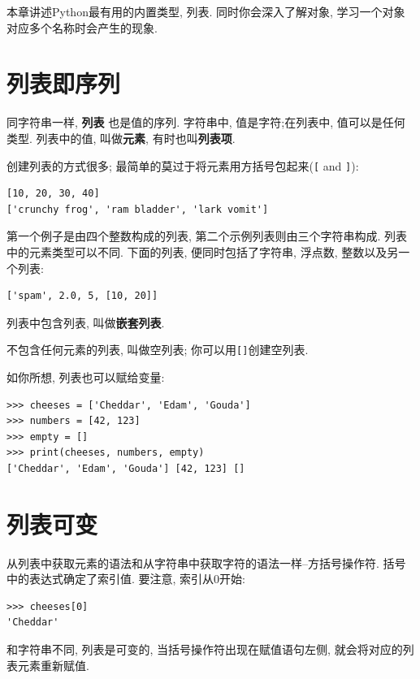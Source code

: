 \documentclass[10pt]{book}
\begin{document}
本章讲述Python最有用的内置类型, 列表. 
同时你会深入了解对象, 学习一个对象对应多个名称时会产生的现象. 


\section{列表即序列}
\label{sequence}

同字符串一样, {\bf 列表} 也是值的序列. 
字符串中, 值是字符;在列表中, 值可以是任何类型. 
列表中的值, 叫做{\bf 元素}, 有时也叫{\bf 列表项}.

创建列表的方式很多; 最简单的莫过于将元素用方括号包起来(\verb"[" and \verb"]"):

\begin{verbatim}
[10, 20, 30, 40]
['crunchy frog', 'ram bladder', 'lark vomit']
\end{verbatim}
%
第一个例子是由四个整数构成的列表, 
第二个示例列表则由三个字符串构成. 
列表中的元素类型可以不同. 
下面的列表, 便同时包括了字符串, 浮点数, 整数以及另一个列表:

\begin{verbatim}
['spam', 2.0, 5, [10, 20]]
\end{verbatim}
%
列表中包含列表, 叫做{\bf 嵌套列表}.

不包含任何元素的列表, 叫做空列表;
你可以用\verb"[]"创建空列表.

如你所想, 列表也可以赋给变量:

\begin{verbatim}
>>> cheeses = ['Cheddar', 'Edam', 'Gouda']
>>> numbers = [42, 123]
>>> empty = []
>>> print(cheeses, numbers, empty)
['Cheddar', 'Edam', 'Gouda'] [42, 123] []
\end{verbatim}
%


\section{列表可变}
\label{mutable}

从列表中获取元素的语法和从字符串中获取字符的语法一样--方括号操作符. 
括号中的表达式确定了索引值. 
要注意, 索引从0开始:

\begin{verbatim}
>>> cheeses[0]
'Cheddar'
\end{verbatim}
%
和字符串不同, 列表是可变的, 当括号操作符出现在赋值语句左侧, 
就会将对应的列表元素重新赋值. 
\end{document}
